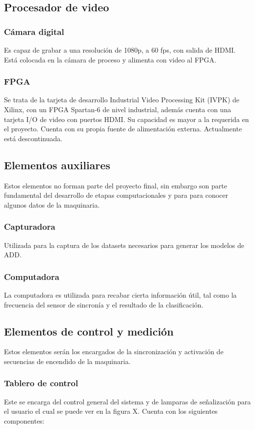\documentclass[twoside,spanish,ESP,MSc]{plantillaLabUPV}
\theoremstyle{definition}
\begin{document}
\subsection{Procesador de video}
\subsubsection{Cámara digital}
Es capaz de grabar a una resolución de 1080p, a 60 fps, con salida de HDMI. Está colocada en la cámara de proceso y alimenta con video al FPGA.
\subsubsection{FPGA}
Se trata de la tarjeta de desarrollo Industrial Video Processing Kit (IVPK) de Xilinx, con un FPGA Spartan-6 de nivel industrial, además cuenta con una tarjeta I/O de video con puertos HDMI. Su capacidad es mayor a la requerida en el proyecto. Cuenta con su propia fuente de alimentación externa. Actualmente está descontinuada.


\subsection{Elementos auxiliares}
Estos elementos no forman parte del proyecto final, sin embargo son parte fundamental del desarrollo de etapas computacionales y para para conocer algunos datos de la maquinaria.

\subsubsection{Capturadora}
Utilizada para la captura de los datasets necesarios para generar los modelos de ADD.

\subsubsection{Computadora}
La computadora es utilizada para recabar cierta información útil, tal como la frecuencia del sensor de sincronía y el resultado de la clasificación.

\subsection{Elementos de control y medición}
Estos elementos serán los encargados de la sincronización y activación de secuencias de encendido de la maquinaria.

\subsubsection{Tablero de control}
Este se encarga del control general del sistema y de lamparas de señalización para el usuario el cual se puede ver en la figura X. Cuenta con los siguientes componentes:
\end{document}
